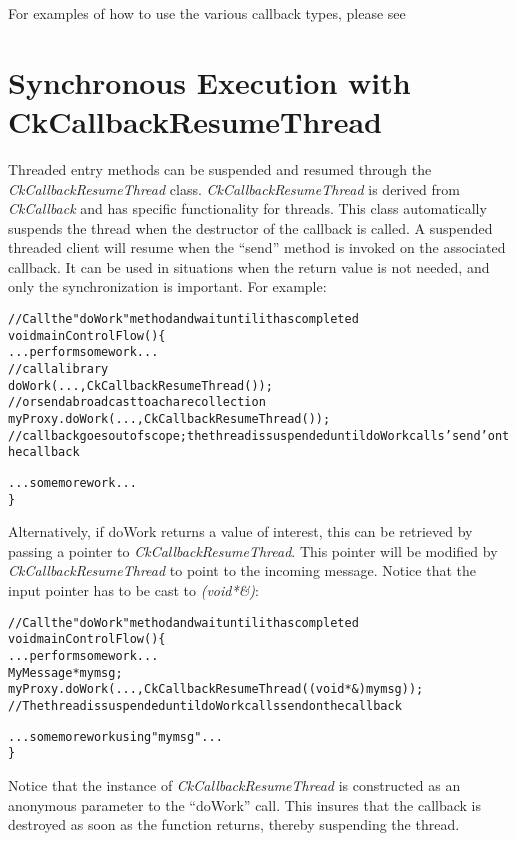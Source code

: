 For examples of how to use the various callback types, please
see 

\section{Synchronous Execution with CkCallbackResumeThread}

\label{sec:ckcallbackresumethread}

Threaded entry methods can be suspended and resumed through the {\em
  CkCallbackResumeThread} class. {\em CkCallbackResumeThread} is
derived from {\em CkCallback} and has specific functionality for
threads.  This class automatically suspends the thread when the
destructor of the callback is called.  A suspended threaded client
will resume when the ``send'' method is invoked on the associated
callback.  It can be used in situations when the return value is not
needed, and only the synchronization is important. For example:

\begin{alltt}
// Call the "doWork" method and wait until it has completed
void mainControlFlow() \{
  ...perform some work...
  // call a library
  doWork(...,CkCallbackResumeThread());
  // or send a broadcast to a chare collection
  myProxy.doWork(...,CkCallbackResumeThread());
  // callback goes out of scope; the thread is suspended until doWork calls 'send' on the callback
  
  ...some more work...
\}
\end{alltt}

Alternatively, if doWork returns a value of interest, this can be retrieved by
passing a pointer to {\em CkCallbackResumeThread}. This pointer will be modified
by {\em CkCallbackResumeThread} to point to the incoming message. Notice that
the input pointer has to be cast to {\em (void*\&)}:

\begin{alltt}
// Call the "doWork" method and wait until it has completed
void mainControlFlow() \{
  ...perform some work...
  MyMessage *mymsg;
  myProxy.doWork(...,CkCallbackResumeThread((void*\&)mymsg));
  // The thread is suspended until doWork calls send on the callback

  ...some more work using "mymsg"...
\}
\end{alltt}

Notice that the instance of {\em CkCallbackResumeThread} is constructed
as an anonymous parameter to the ``doWork'' call. This insures that the callback
is destroyed as soon as the function returns, thereby suspending the thread.

